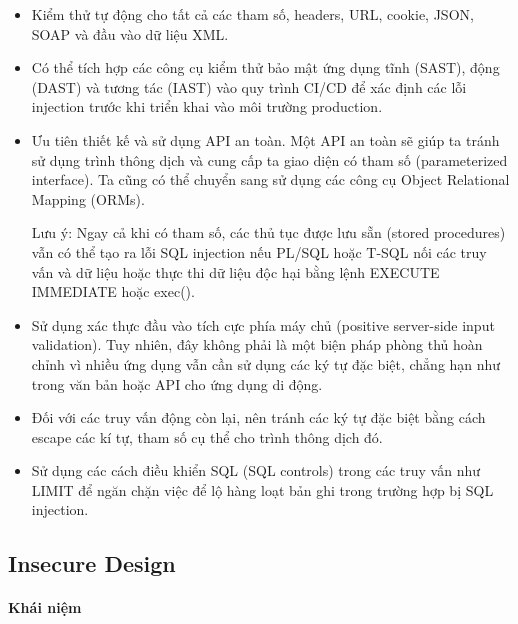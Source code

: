\begin{itemize}
    \item Kiểm thử tự động cho tất cả các tham số, headers, URL, cookie, JSON, SOAP và đầu vào dữ liệu XML.
    \item Có thể tích hợp các công cụ kiểm thử bảo mật ứng dụng tĩnh (SAST), động (DAST) và tương tác (IAST) vào quy trình CI/CD để xác định các lỗi injection trước khi triển khai vào môi trường production.
    \item Ưu tiên thiết kế và sử dụng API an toàn. Một API an toàn sẽ giúp ta tránh sử dụng trình thông dịch và cung cấp ta giao diện có tham số (parameterized interface). Ta cũng có thể chuyển sang sử dụng các công cụ Object Relational Mapping (ORMs).
    \par
    Lưu ý: Ngay cả khi có tham số, các thủ tục được lưu sẵn (stored procedures) vẫn có thể tạo ra lỗi SQL injection nếu PL/SQL hoặc T-SQL nối các truy vấn và dữ liệu hoặc thực thi dữ liệu độc hại bằng lệnh EXECUTE IMMEDIATE hoặc exec().
    \item Sử dụng xác thực đầu vào tích cực phía máy chủ (positive server-side input validation). Tuy nhiên, đây không phải là một biện pháp phòng thủ hoàn chỉnh vì nhiều ứng dụng vẫn cần sử dụng các ký tự đặc biệt, chẳng hạn như trong văn bản hoặc API cho ứng dụng di động.
    \item Đối với các truy vấn động còn lại, nên tránh các ký tự đặc biệt bằng cách escape các kí tự, tham số cụ thể cho trình thông dịch đó.
    \item Sử dụng các cách điều khiển SQL (SQL controls) trong các truy vấn như LIMIT để ngăn chặn việc để lộ hàng loạt bản ghi trong trường hợp bị SQL injection.
\end{itemize}

\subsection{Insecure Design ~\cite{chap2bib17}}

\paragraph{Khái niệm ~\cite{chap2bib18}}

